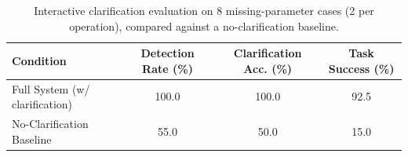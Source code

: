 \begin{table}[t]
\centering
\caption{Interactive clarification evaluation on 8 missing-parameter cases (2 per
operation), compared against a no-clarification baseline.}
\label{tab:clarification}
\begin{tabular}{lccc}
\toprule
Condition & Detection Rate (\%) & Clarification Acc. (\%) & Task Success (\%) \\
\midrule
Full System (w/ clarification) & 100.0 & 100.0 & 92.5 \\
No-Clarification Baseline      & 55.0 & 50.0 & 15.0 \\
\bottomrule
\end{tabular}
\end{table}

